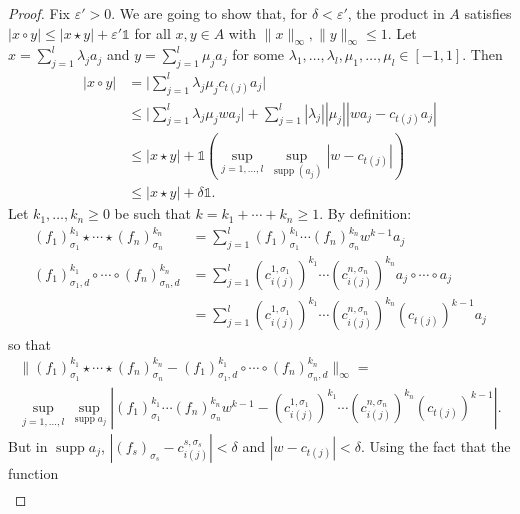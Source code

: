 \documentclass{memo-l}
\theoremstyle{definition}
\theoremstyle{remark}
\numberwithin{section}{chapter}
\numberwithin{equation}{chapter}
\newcommand{\one}{\ensuremath{\mathbb{1}}}
\DeclareMathOperator{\supp}{supp}
\begin{document}
\begin{proof}
    Fix $\varepsilon '>0$. We are going to show that, for $\delta
    <\varepsilon '$,
    the product in $A$ satisfies $|x\circ y|\le
    |x\star y|+\varepsilon '\one$ for all $x,y \in A$ with $\|x\|_\infty
    ,\|y\|_\infty \le 1$. Let
    $x=\sum_{j=1}^{l}\lambda _ja_j$ and $y=\sum_{j=1}^{l}\mu _j a_j$
    for some $\lambda _1,\ldots ,\lambda _l,\mu _1,\ldots ,\mu _l \in
    [-1,1]$. Then
    \begin{align*}
        |x\circ y|&=\bigg| \sum_{j=1}^{l}\lambda _j\mu
        _jc_{t(j)}a_j\bigg|\\&\le
    \bigg|\sum_{j=1}^{l}\lambda _j \mu _j w a_j\bigg| + \sum_{j=1}^{l}|\lambda
        _j| |\mu _j| |wa_j-c_{t(j)}a_j|\\&\le |x\star y|+\one (\sup_{j=1,\ldots
    ,l}\sup_{\supp(a_j)} |w-c_{t(j)}|)\\
                                         &\le |x\star y| + \delta \one.
    \end{align*}
    Let $k_1,\ldots ,k_n\ge 0$ be such that $k=k_1+ \cdots +k_n\ge 1$.
    By definition:
    \begin{align*}
        (f  _1)_{\sigma _1}^{k_1}\star \cdots \star (f
        _n)_{\sigma _n}^{k_n}&=\sum_{j=1}^{l}(f
        _1)_{\sigma _1}^{k_1}\cdots (f _n)_{\sigma _n}^{k_n}w^{k-1}a_j\\
        (f  _1)_{\sigma _1,d}^{k_1}\circ \cdots \circ (f
        _n)_{\sigma _n,d}^{k_n}&=\sum_{j=1}^{l} (c_{i(j)}^{1,\sigma
        _1})^{k_1}\cdots (c_{i(j)}^{n,\sigma _n})^{k_n} a_j\circ
        \cdots \circ a_j\\
                               &=\sum_{j=1}^{l} (c_{i(j)}^{1,\sigma
        _1})^{k_1}\cdots (c_{i(j)}^{n,\sigma _n})^{k_n}
        (c_{t(j)})^{k-1}a_j
    \end{align*}
    so that
    \begin{multline*}
        \|(f  _1)_{\sigma _1}^{k_1}\star \cdots \star (f
        _n)_{\sigma _n}^{k_n}-(f  _1)_{\sigma _1,d}^{k_1}\circ \cdots \circ (f
        _n)_{\sigma _n,d}^{k_n}\|_\infty =\\
        \sup_{j=1,\ldots ,l}\sup_{\supp a_j} | (f
        _1)_{\sigma _1}^{k_1}\cdots (f _n)_{\sigma
        _n}^{k_n}w^{k-1} - (c_{i(j)}^{1,\sigma
        _1})^{k_1}\cdots (c_{i(j)}^{n,\sigma _n})^{k_n}
        (c_{t(j)})^{k-1}|.
    \end{multline*}
    But in $\supp a_j$, $|(f _s)_{\sigma
    _s}-c_{i(j)}^{s,\sigma _s}|<\delta $ and $|w-c_{t(j)}|<\delta $.
    Using the fact that the function
    \[
    \begin{array}{cccc}

\end{array}\]
\end{proof}
\end{document}
